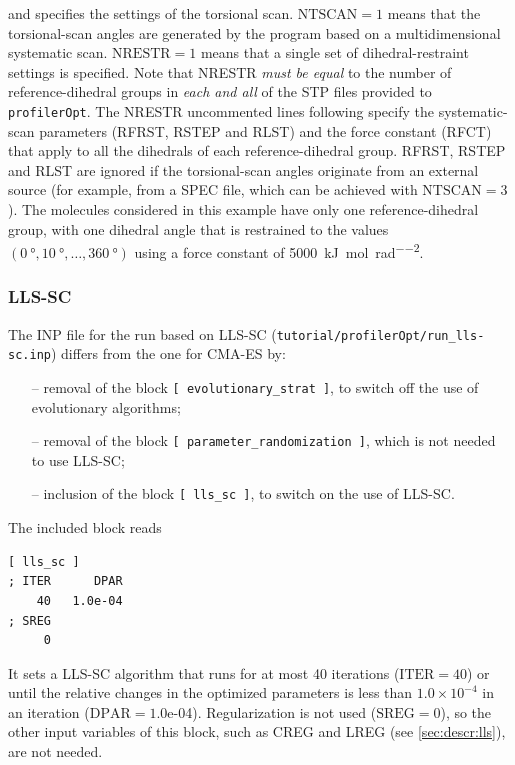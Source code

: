 \documentclass[10pt,a4paper,openany]{memoir}
\numberwithin{equation}{section}
\newcommand{\profileropt}[0]{\texttt{profilerOpt}}
\newcommand{\varset}[2]{$\text{#1}=#2$}
\begin{document}
\noindent and specifies the settings of the torsional scan.  \varset{NTSCAN}{1}
means that the torsional-scan angles are generated by the program based on a
multidimensional systematic scan.  \varset{NRESTR}{1} means that a single set of
dihedral-restraint settings is specified.  Note that NRESTR \textit{must be
  equal} to the number of reference-dihedral groups in \textit{each and all} of
the STP files provided to \profileropt{}. The NRESTR uncommented lines following
specify the systematic-scan parameters (RFRST, RSTEP and RLST) and the force
constant (RFCT) that apply to all the dihedrals of each reference-dihedral
group.  RFRST, RSTEP and RLST are ignored if the torsional-scan angles originate
from an external source (for example, from a SPEC file, which can be achieved
with \varset{NTSCAN}{3}).  The molecules considered in this example have only
one reference-dihedral group, with one dihedral angle that is restrained to the
values $(\SI{0}{\degree},\SI{10}{\degree},\ldots,\SI{360}{\degree})$ using a
force constant of \SI{5000}{\kJ\per\mole\per\radian\squared}.

\subsubsection{LLS-SC}

The INP file for the run based on LLS-SC
(\texttt{tutorial/profilerOpt/run\_lls-sc.inp}) differs from the one for
CMA-ES by:
\begin{itemize}
  \item[--] removal of the block \texttt{[~evolutionary\_strat~]}, to switch
    off the use of evolutionary algorithms;
  \item[--] removal of the block \texttt{[~parameter\_randomization~]},
  which is not needed to use LLS-SC;
\item[--] inclusion of the block \texttt{[~lls\_sc~]}, to switch on
  the use of LLS-SC.
\end{itemize}

The included block reads

\begin{lstlisting}[language=gromacs]
[ lls_sc ]
; ITER      DPAR
    40   1.0e-04
; SREG
     0
\end{lstlisting}\vspace{2ex}\par

\noindent It sets a LLS-SC algorithm that runs for at most 40
iterations (\varset{ITER}{40}) or until the relative changes in the
optimized parameters is less than $1.0\times 10^{-4}$ in an iteration
(\varset{DPAR}{1.0}e-04).
%
Regularization is not used (\varset{SREG}{0}), so the other input
variables of this block, such as CREG and LREG (see
\autoref{sec:descr:lls}), are not needed.
\end{document}
